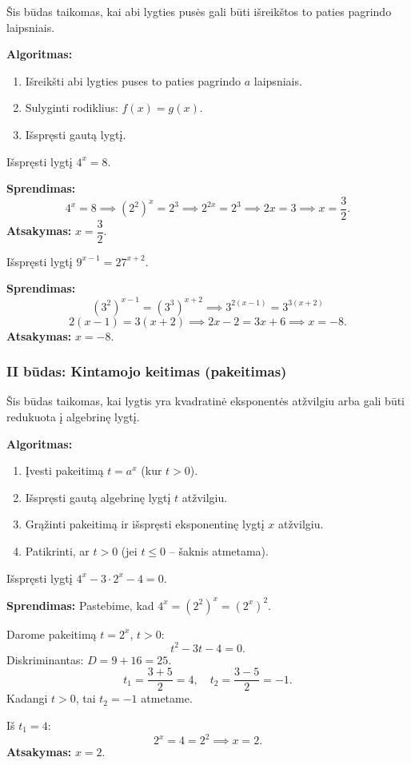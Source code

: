 Šis būdas taikomas, kai abi lygties pusės gali būti išreikštos to paties pagrindo laipsniais.

\textbf{Algoritmas:}
\begin{enumerate}
    \item Išreikšti abi lygties puses to paties pagrindo $a$ laipsniais.
    \item Sulyginti rodiklius: $f(x) = g(x)$.
    \item Išspręsti gautą lygtį.
\end{enumerate}

\begin{example}
Išspręsti lygtį $4^{x} = 8$.

\textbf{Sprendimas:}
\[
4^x = 8 \implies (2^2)^x = 2^3 \implies 2^{2x} = 2^3 \implies 2x = 3 \implies x = \frac{3}{2}.
\]
\textbf{Atsakymas:} $x = \dfrac{3}{2}$.
\end{example}

\begin{example}
Išspręsti lygtį $9^{x-1} = 27^{x+2}$.

\textbf{Sprendimas:}
\[
(3^2)^{x-1} = (3^3)^{x+2} \implies 3^{2(x-1)} = 3^{3(x+2)}
\]
\[
2(x-1) = 3(x+2) \implies 2x - 2 = 3x + 6 \implies x = -8.
\]
\textbf{Atsakymas:} $x = -8$.
\end{example}

\subsubsection*{II būdas: Kintamojo keitimas (pakeitimas)}

Šis būdas taikomas, kai lygtis yra kvadratinė eksponentės atžvilgiu arba gali būti 
redukuota į algebrinę lygtį.

\textbf{Algoritmas:}
\begin{enumerate}
    \item Įvesti pakeitimą $t = a^x$ (kur $t > 0$).
    \item Išspręsti gautą algebrinę lygtį $t$ atžvilgiu.
    \item Grąžinti pakeitimą ir išspręsti eksponentinę lygtį $x$ atžvilgiu.
    \item Patikrinti, ar $t > 0$ (jei $t \leq 0$ – šaknis atmetama).
\end{enumerate}

\begin{example}
Išspręsti lygtį $4^{x} - 3 \cdot 2^{x} - 4 = 0$.

\textbf{Sprendimas:} Pastebime, kad $4^x = (2^2)^x = (2^x)^2$.

Darome pakeitimą $t = 2^x$, $t > 0$:
\[
t^2 - 3t - 4 = 0.
\]
Diskriminantas: $D = 9 + 16 = 25$.
\[
t_1 = \frac{3+5}{2} = 4, \quad t_2 = \frac{3-5}{2} = -1.
\]
Kadangi $t > 0$, tai $t_2 = -1$ atmetame.

Iš $t_1 = 4$:
\[
2^x = 4 = 2^2 \implies x = 2.
\]
\textbf{Atsakymas:} $x = 2$.
\end{example}

